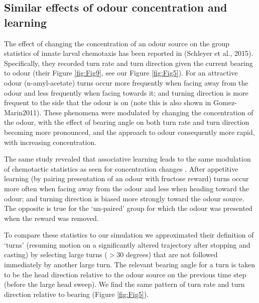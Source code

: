 \documentclass[10pt,a4paper]{article}
\begin{document}




\subsection{Similar effects of odour concentration and learning}
The effect of changing the concentration of an odour source on the group statistics of innate larval chemotaxis has been reported in (Schleyer et al., 2015). Specifically, they recorded turn rate and turn direction given the current bearing to odour (their Figure \ref{fig:Fig9}, see our Figure \ref{fig:Fig5}). For an attractive odour (n-amyl-acetate) turns occur more frequently when facing away from the odour and less frequently when facing towards it; and turning direction is more frequent to the side that the odour is on (note this is also shown in Gomez-Marin2011). These phenomena were modulated by changing the concentration of the odour, with the effect of bearing angle on both turn rate and turn direction becoming more pronounced, and the approach to odour consequently more rapid, with increasing concentration.

The same \cite{schleyer2015learning} study revealed that associative learning leads to the same modulation of chemotactic statistics as seen for concentration changes \citep[][Figure 5]{schleyer2015learning}. After appetitive learning (by pairing presentation of an odour with fructose reward) turns occur more often when facing away from the odour and less when heading toward the odour; and turning direction is biased more strongly toward the odour source. The opposite is true for the ‘un-paired’ group for which the odour was presented when the reward was removed. 


 To compare these statistics to our simulation we approximated their definition of ‘turns’ (resuming motion on a significantly altered trajectory after stopping and casting) by selecting large turns ($>30$ degrees) that are not followed immediately by another large turn. The relevant bearing angle for a turn is taken to be the head direction relative to the odour source on the previous time step (before the large head sweep). We find the same pattern of turn rate and turn direction relative to bearing (Figure \ref{fig:Fig5}).
\end{document}
